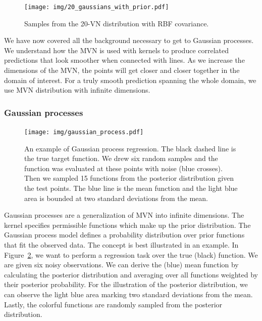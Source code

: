 \begin{figure}
    \centering
    \texttt{[image: img/20\_gaussians\_with\_prior.pdf]}
    \caption{Samples from the 20-VN distribution with RBF covariance.}
    \label{fig:f3}
\end{figure}


We have now covered all the background necessary to get to Gaussian processes. We understand how the MVN is used with kernels to produce correlated predictions that look smoother when connected with lines. As we increase the dimensions of the MVN, the points will get closer and closer together in the domain of interest. For a truly smooth prediction spanning the whole domain, we use MVN distribution with infinite dimensions. %


\subsubsection{Gaussian processes}

\begin{figure}
    \centering
    \texttt{[image: img/gaussian\_process.pdf]}
    \caption{An example of Gaussian process regression. The black dashed line is the true target function. We drew six random samples and the function was evaluated at these points with noise (blue crosses). Then we sampled 15 functions from the posterior distribution given the test points. The blue line is the mean function and the light blue area is bounded at two standard deviations from the mean.}
    \label{fig:f4}
\end{figure}

Gaussian processes are a generalization of MVN into infinite dimensions. The kernel specifies permissible functions which make up the prior distribution. The Gaussian process model defines a probability distribution over prior functions that fit the observed data. The concept is best illustrated in an example. In Figure~\ref{fig:f4}, we want to perform a regression task over the true (black) function. We are given six noisy observations. We can derive the (blue) mean function by calculating the posterior distribution and averaging over all functions weighted by their posterior probability. For the illustration of the posterior distribution, we can observe the light blue area marking two standard deviations from the mean. Lastly, the colorful functions are randomly sampled from the posterior distribution.


